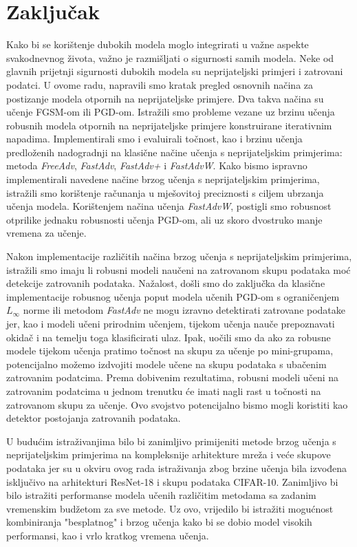 \documentclass[times, utf8, zavrsni, numeric]{fer}
\begin{document}
\chapter{Zaključak}

Kako bi se korištenje dubokih modela moglo integrirati u važne aspekte svakodnevnog života, važno je razmišljati o sigurnosti samih modela. 
Neke od glavnih prijetnji sigurnosti dubokih modela su neprijateljski primjeri i zatrovani podatci.
U ovome radu, napravili smo kratak pregled osnovnih načina za postizanje modela otpornih na neprijateljske primjere. Dva takva načina su učenje FGSM-om ili PGD-om.
Istražili smo probleme vezane uz brzinu učenja robusnih modela otpornih na neprijateljske primjere konstruirane iterativnim napadima.
Implementirali smo i evaluirali točnost, kao i brzinu učenja predloženih nadogradnji na klasične načine učenja s neprijateljskim primjerima: metoda \textit{FreeAdv}, \textit{FastAdv}, \textit{FastAdv+} i \textit{FastAdvW}.
Kako bismo ispravno implementirali navedene načine brzog učenja s neprijateljskim primjerima, istražili smo korištenje računanja u mješovitoj preciznosti s ciljem ubrzanja učenja modela.
Korištenjem načina učenja \textit{FastAdvW}, postigli smo robusnost otprilike jednaku robusnosti učenja PGD-om, ali uz skoro dvostruko manje vremena za učenje.

Nakon implementacije različitih načina brzog učenja s neprijateljskim primjerima, istražili smo imaju li robusni modeli naučeni na zatrovanom skupu podataka moć detekcije zatrovanih podataka.
Nažalost, došli smo do zaključka da klasične implementacije robusnog učenja poput modela učenih PGD-om s ograničenjem $L_\infty$ norme ili metodom \textit{FastAdv} ne mogu izravno detektirati zatrovane podatake jer, kao i modeli učeni prirodnim učenjem, 
tijekom učenja nauče prepoznavati okidač i na temelju toga klasificirati ulaz. 
Ipak, uočili smo da ako za robusne modele tijekom učenja pratimo točnost na skupu za učenje po mini-grupama, potencijalno možemo izdvojiti modele učene na skupu podataka s ubačenim zatrovanim podatcima.
Prema dobivenim rezultatima, robusni modeli učeni na zatrovanim podatcima u jednom trenutku će imati nagli rast u točnosti na zatrovanom skupu za učenje. Ovo svojstvo potencijalno bismo mogli koristiti kao detektor postojanja zatrovanih podataka.

\pagebreak

U budućim istraživanjima bilo bi zanimljivo primijeniti metode brzog učenja s neprijateljskim primjerima na kompleksnije arhitekture mreža i veće skupove podataka 
jer su u okviru ovog rada istraživanja zbog brzine učenja bila izvođena isključivo na arhitekturi ResNet-18 i skupu podataka CIFAR-10. 
Zanimljivo bi bilo istražiti performanse modela učenih različitim metodama sa zadanim vremenskim budžetom za sve metode.
Uz ovo, vrijedilo bi istražiti mogućnost kombiniranja "besplatnog" i brzog učenja kako bi se dobio model visokih performansi, kao i vrlo kratkog vremena učenja. 
\end{document}
